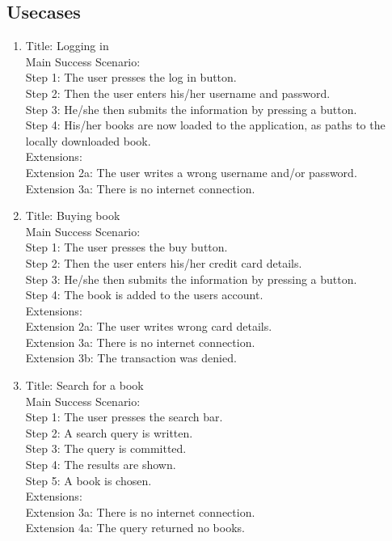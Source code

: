 \message{ !name(Rapport.tex)}\documentclass[12pt]{article}
\begin{document}
\subsection{Usecases}

\begin{enumerate}
\item 
Title: Logging in\\
Main Success Scenario:\\
  Step 1: The user presses the log in button.\\
  Step 2: Then the user enters his/her username and password.\\
  Step 3: He/she then submits the information by pressing a button.\\
  Step 4: His/her books are now loaded to the application, as paths to the locally downloaded book.\\
Extensions:\\
  Extension 2a: The user writes a wrong username and/or password.\\
  Extension 3a: There is no internet connection.\\
\item 
Title: Buying book\\
Main Success Scenario:\\
  Step 1: The user presses the buy button.\\
  Step 2: Then the user enters his/her credit card details.\\
  Step 3: He/she then submits the information by pressing a button.\\
  Step 4: The book is added to the users account.\\
Extensions:\\
  Extension 2a: The user writes wrong card details.\\
  Extension 3a: There is no internet connection.\\
  Extension 3b: The transaction was denied.\\
\item 
Title: Search for a book\\
Main Success Scenario:\\
  Step 1: The user presses the search bar.\\
  Step 2: A search query is written.\\
  Step 3: The query is committed.\\
  Step 4: The results are shown.\\
  Step 5: A book is chosen.\\
Extensions:\\
  Extension 3a: There is no internet connection.\\
  Extension 4a: The query returned no books.\\
\end{enumerate}
\end{document}

